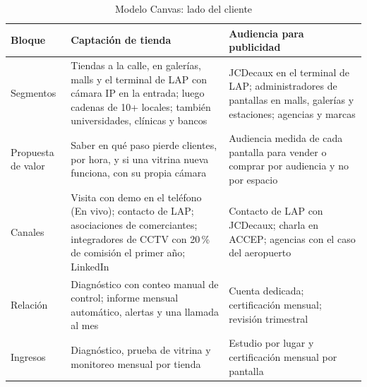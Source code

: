 \documentclass[12pt,a4paper]{article}
\begin{document}
\begin{table}[H]
\caption{Modelo Canvas: lado del cliente}
\label{tab:canvas-cliente}
\centering
\footnotesize
\renewcommand{\arraystretch}{1.12}
\begin{tabular}{|L{0.14\textwidth}|L{0.38\textwidth}|L{0.38\textwidth}|}
\hline
\textbf{Bloque} & \textbf{Captación de tienda} & \textbf{Audiencia para publicidad} \\
\hline
Segmentos & Tiendas a la calle, en galerías, malls y el terminal de LAP con cámara IP en la entrada; luego cadenas de 10+ locales; también universidades, clínicas y bancos & JCDecaux en el terminal de LAP; administradores de pantallas en malls, galerías y estaciones; agencias y marcas \\
\hline
Propuesta de valor & Saber en qué paso pierde clientes, por hora, y si una vitrina nueva funciona, con su propia cámara & Audiencia medida de cada pantalla para vender o comprar por audiencia y no por espacio \\
\hline
Canales & Visita con demo en el teléfono (En vivo); contacto de LAP; asociaciones de comerciantes; integradores de CCTV con 20\,\% de comisión el primer año; LinkedIn & Contacto de LAP con JCDecaux; charla en ACCEP; agencias con el caso del aeropuerto \\
\hline
Relación & Diagnóstico con conteo manual de control; informe mensual automático, alertas y una llamada al mes & Cuenta dedicada; certificación mensual; revisión trimestral \\
\hline
Ingresos & Diagnóstico, prueba de vitrina y monitoreo mensual por tienda & Estudio por lugar y certificación mensual por pantalla \\
\hline
\end{tabular}
\end{table}
\end{document}
